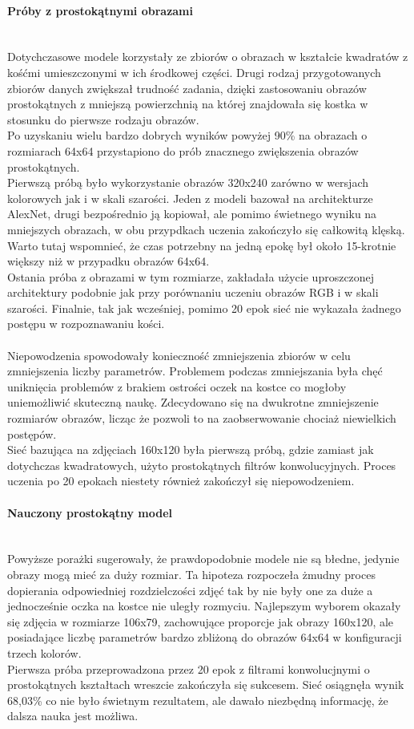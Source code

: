 \paragraph{Próby z prostokątnymi obrazami} \mbox{}\\
Dotychczasowe modele korzystały ze zbiorów o obrazach w kształcie kwadratów z kośćmi
umieszczonymi w ich środkowej części. Drugi rodzaj przygotowanych zbiorów danych zwiększał
trudność zadania, dzięki zastosowaniu obrazów prostokątnych z mniejszą powierzchnią
na której znajdowała się kostka w stosunku do pierwsze rodzaju obrazów.\\
Po uzyskaniu wielu bardzo dobrych wyników powyżej 90\% na obrazach o rozmiarach 64x64
przystapiono do prób znacznego zwiększenia obrazów prostokątnych.\\
Pierwszą próbą było wykorzystanie obrazów 320x240 zarówno w wersjach kolorowych jak
i w skali szarości. Jeden z modeli bazował na architekturze AlexNet, drugi bezpośrednio
ją kopiował, ale pomimo świetnego wyniku na mniejszych obrazach, w obu przypdkach
uczenia zakończyło się całkowitą klęską. Warto tutaj wspomnieć, że czas potrzebny na
jedną epokę był około 15-krotnie większy niż w przypadku obrazów 64x64.\\
Ostania próba z obrazami w tym rozmiarze, zakładała użycie uproszczonej architektury
podobnie jak przy porównaniu uczeniu obrazów RGB i w skali szarości. Finalnie, tak jak
wcześniej, pomimo 20 epok sieć nie wykazała żadnego postępu w rozpoznawaniu kości.\\\\
Niepowodzenia spowodowały konieczność zmniejszenia zbiorów w celu zmniejszenia liczby
parametrów. Problemem podczas zmniejszania była chęć uniknięcia problemów z brakiem ostrości
oczek na kostce co mogłoby uniemożliwić skuteczną naukę. Zdecydowano się na dwukrotne
zmniejszenie rozmiarów obrazów, licząc że pozwoli to na zaobserwowanie chociaż niewielkich
postępów.\\
Sieć bazująca na zdjęciach 160x120 była pierwszą próbą, gdzie zamiast jak dotychczas
kwadratowych, użyto prostokątnych filtrów konwolucyjnych. Proces uczenia po 20 epokach
niestety również zakończył się niepowodzeniem.

\paragraph{Nauczony prostokątny model} \mbox{}\\
Powyższe porażki sugerowały, że prawdopodobnie modele nie są błedne, jedynie obrazy
mogą mieć za duży rozmiar. Ta hipoteza rozpoczeła żmudny proces dopierania odpowiedniej
rozdzielczości zdjęć tak by nie były one za duże a jednocześnie oczka na kostce nie
uległy rozmyciu. Najlepszym wyborem okazały się zdjęcia w rozmiarze 106x79, zachowujące
proporcje jak obrazy 160x120, ale posiadające liczbę parametrów bardzo zbliżoną do
obrazów 64x64 w konfiguracji trzech kolorów.\\
Pierwsza próba przeprowadzona przez 20 epok z filtrami konwolucjnymi o prostokątnych
kształtach wreszcie zakończyła się sukcesem. Sieć osiągnęła wynik 68,03\% co nie
było świetnym rezultatem, ale dawało niezbędną informację, że dalsza nauka jest możliwa.

